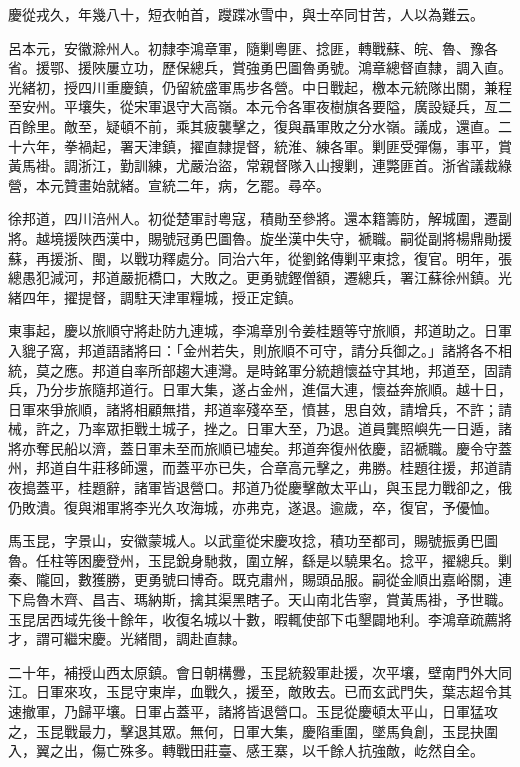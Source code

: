 \begin{pinyinscope}
慶從戎久，年幾八十，短衣帕首，躞蹀冰雪中，與士卒同甘苦，人以為難云。

呂本元，安徽滁州人。初隸李鴻章軍，隨剿粵匪、捻匪，轉戰蘇、皖、魯、豫各省。援鄂、援陜屢立功，歷保總兵，賞強勇巴圖魯勇號。鴻章總督直隸，調入直。光緒初，授四川重慶鎮，仍留統盛軍馬步各營。中日戰起，檄本元統隊出關，兼程至安州。平壤失，從宋軍退守大高嶺。本元令各軍夜樹旗各要隘，廣設疑兵，亙二百餘里。敵至，疑頓不前，乘其疲襲擊之，復與聶軍敗之分水嶺。議成，還直。二十六年，拳禍起，署天津鎮，擢直隸提督，統淮、練各軍。剿匪受彈傷，事平，賞黃馬褂。調浙江，勤訓練，尤嚴治盜，常親督隊入山搜剿，連斃匪首。浙省議裁綠營，本元贊畫始就緒。宣統二年，病，乞罷。尋卒。

徐邦道，四川涪州人。初從楚軍討粵寇，積勛至參將。還本籍籌防，解城圍，遷副將。越境援陜西漢中，賜號冠勇巴圖魯。旋坐漢中失守，褫職。嗣從副將楊鼎勛援蘇，再援浙、閩，以戰功釋處分。同治六年，從劉銘傳剿平東捻，復官。明年，張總愚犯減河，邦道嚴扼橋口，大敗之。更勇號鏗僧額，遷總兵，署江蘇徐州鎮。光緒四年，擢提督，調駐天津軍糧城，授正定鎮。

東事起，慶以旅順守將赴防九連城，李鴻章別令姜桂題等守旅順，邦道助之。日軍入貔子窩，邦道語諸將曰：「金州若失，則旅順不可守，請分兵御之。」諸將各不相統，莫之應。邦道自率所部趨大連灣。是時銘軍分統趙懷益守其地，邦道至，固請兵，乃分步旅隨邦道行。日軍大集，遂占金州，進偪大連，懷益奔旅順。越十日，日軍來爭旅順，諸將相顧無措，邦道率殘卒至，憤甚，思自效，請增兵，不許；請械，許之，乃率眾拒戰土城子，挫之。日軍大至，乃退。道員龔照嶼先一日遁，諸將亦奪民船以濟，蓋日軍未至而旅順已墟矣。邦道奔復州依慶，詔褫職。慶令守蓋州，邦道自牛莊移師還，而蓋平亦已失，合章高元擊之，弗勝。桂題往援，邦道請夜搗蓋平，桂題辭，諸軍皆退營口。邦道乃從慶擊敵太平山，與玉昆力戰卻之，俄仍敗潰。復與湘軍將李光久攻海城，亦弗克，遂退。逾歲，卒，復官，予優恤。

馬玉昆，字景山，安徽蒙城人。以武童從宋慶攻捻，積功至都司，賜號振勇巴圖魯。任柱等困慶登州，玉昆銳身馳救，圍立解，繇是以驍果名。捻平，擢總兵。剿秦、隴回，數獲勝，更勇號曰博奇。既克肅州，賜頭品服。嗣從金順出嘉峪關，連下烏魯木齊、昌吉、瑪納斯，擒其渠黑瞎子。天山南北告寧，賞黃馬褂，予世職。玉昆居西域先後十餘年，收復名城以十數，暇輒使部下屯墾闢地利。李鴻章疏薦將才，謂可繼宋慶。光緒間，調赴直隸。

二十年，補授山西太原鎮。會日朝構釁，玉昆統毅軍赴援，次平壤，壁南門外大同江。日軍來攻，玉昆守東岸，血戰久，援至，敵敗去。已而玄武門失，葉志超令其速撤軍，乃歸平壤。日軍占蓋平，諸將皆退營口。玉昆從慶頓太平山，日軍猛攻之，玉昆戰最力，擊退其眾。無何，日軍大集，慶陷重圍，墜馬負創，玉昆抉圍入，翼之出，傷亡殊多。轉戰田莊臺、感王寨，以千餘人抗強敵，屹然自全。


\end{pinyinscope}

